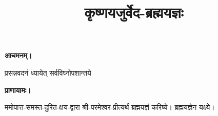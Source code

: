 \setmainfont[Script=Devanagari,Mapping=tex-text,Mapping=devanagarinumerals,AutoFakeBold=2.0]{Siddhanta}
\title{\Huge कृष्णयजुर्वेद-ब्रह्मयज्ञः}
\date{}
\maketitle
\clearemptydoublepage
{}


\textbf{आचमनम्।}

{प्रसन्नवदनं ध्यायेत् सर्वविघ्नोपशान्तये}

\textbf{प्राणायामः।}

ममोपात्त-समस्त-दुरित-क्षय-द्वारा श्री-परमेश्वर-प्रीत्यर्थं ब्रह्मयज्ञं करिष्ये। ब्रह्मयज्ञेन यक्ष्ये।


